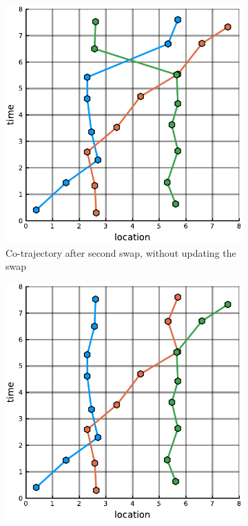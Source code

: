 \documentclass[12pt]{article}
\theoremstyle{definition}
\begin{document}
\begin{figure}
    \begin{subfigure}[t]{0.45\textwidth}
      \includegraphics[width=\textwidth]{swaporder-c.pdf}
      \caption{Co-trajectory after second swap, without updating the
        swap}
      \label{fig:swap-order-c}
    \end{subfigure}
    \begin{subfigure}[t]{0.45\textwidth}
      \includegraphics[width=\textwidth]{swaporder-d.pdf}

\end{subfigure}
\end{figure}
\end{document}
